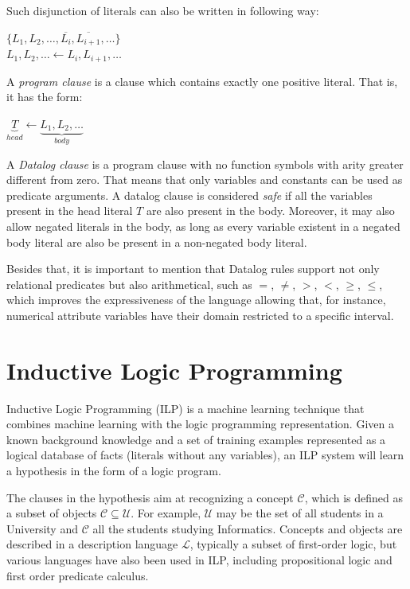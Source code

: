 Such disjunction of literals can also be written in following way:
\begin{center}
 $\{L_1,L_2,\ldots,\overline{L_i},\overline{L_{i+1}},\ldots\}$ \\
$ L_1,L_2,\ldots \leftarrow L_i,L_{i+1},\ldots$
\end{center}

A \emph{program clause} is a clause which contains exactly one positive literal. That is, it has the form:
\begin{center}
 $\underbrace{T}_{head} \leftarrow \underbrace{L_1,L_2,\ldots}_{body}$
\end{center}

A \emph{Datalog clause} is a program clause with no function symbols with arity greater different from zero. That
means that only variables and constants can be used as predicate arguments. A datalog clause is considered \emph{safe}
if all the variables present in the head literal $T$ are also present in the body. Moreover, it may also allow negated
literals in the body, as long as every variable existent in a negated body literal are also be present in a
non-negated body literal.

Besides that, it is important to mention that Datalog rules support not only relational predicates but also
arithmetical, such as $=$, $\neq$, $>$, $<$, $\geq$, $\leq$, which improves the expressiveness of the language
allowing that, for instance, numerical attribute variables have their domain restricted to a specific interval.

\section{Inductive Logic Programming}
\label{sec:rw-ilp}

Inductive Logic Programming (ILP) is a machine learning technique that combines machine learning with the
logic programming representation. Given a known background knowledge and a set of training examples represented as a
logical database of facts (literals without any variables), an ILP system will learn a hypothesis in the form of a
logic program.

The clauses in the hypothesis aim at recognizing a concept $\mathcal{C}$, which is defined as a subset of objects
$\mathcal{C} \subseteq \mathcal{U}$. For example, $\mathcal{U}$ may be the set of all students in a University and
$\mathcal{C}$ all the students studying Informatics.
Concepts and objects are described in a description language $\mathcal{L}$, typically a subset of first-order logic,
but
various languages have also been used in ILP, including propositional logic and first order predicate calculus.

